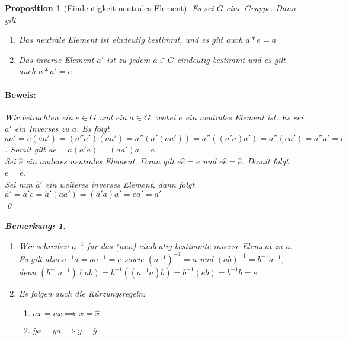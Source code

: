 \documentclass{report}
\theoremstyle{customrem}
\newtheorem*{bemerkung}{Bemerkung\textnormal:}
\theoremstyle{customdef}
\newtheorem{proposition}[definition]{Proposition}
\renewenvironment{proof}{\paragraph{Beweis: }}{\qed}
\theoremstyle{customenv}
\begin{document}
	\begin{proposition}[Eindeutigkeit neutrales Element]
		Es sei \(G\) eine Gruppe. Dann gilt
		\begin{enumerate}
			\itemsep0cm
			\item Das neutrale Element ist eindeutig bestimmt, und es gilt auch \(a \ast e = a\)
			\item Das inverse Element \(a'\) ist zu jedem \(a \in G\) eindeutig bestimmt und es gilt auch \(a \ast a' = e\)
		\end{enumerate}
		
		\begin{proof}
			Wir betrachten ein \(e \in G\) und ein \(a \in G\), wobei \(e\) ein neutrales Element ist. Es sei \(a'\) ein Inverses zu \(a\). Es folgt 
			\(a a' = e (a a') = (a'' a') (a a') = a'' (a' (a a')) = a'' ((a' a) a') = a'' (e a') = a'' a' = e\).
			Somit gilt \(a e = a (a' a) = (a a') a = a\).\\
			
			Sei \(\hat{e}\) ein anderes neutrales Element. Dann gilt \(e \hat{e} = e\) und \(e \hat{e} = \hat{e}\). Damit folgt \(e = \hat{e}\).\\
			
			Sei nun \(\hat{a}'\) ein weiteres inverses Element, dann folgt 
			\(\hat{a}' = \hat{a}' e = \hat{a}' (aa') = (\hat{a}'a)a' = ea' = a'\)\\
		\end{proof}\vspace{.25cm}
		\begin{bemerkung} \( \)
			\begin{enumerate}
				\itemsep0cm
				\item Wir schreiben \(a^{-1}\) für das (nun) eindeutig bestimmte inverse Element zu a.
				Es gilt also \(a^{-1}a = aa^{-1} = e\) sowie \((a^{-1})^{-1} = a\) und \((ab)^{-1} = b^{-1}a^{-1}\), denn \((b^{-1}a^{-1})(ab) = b^{-1}((a^{-1}a)b) = b^{-1}(eb) = b^{-1}b = e\)
				\item Es folgen auch die Kürzungsregeln:
				\begin{enumerate}[leftmargin=4.25cm]
					\itemsep0cm
					\item \(a \hat{x} = ax \implies x = \hat{x}\)
					\item \(\hat{y}a = ya \implies y = \hat{y}\)
				\end{enumerate}
			\end{enumerate}
		\end{bemerkung}
	\end{proposition}
	
\end{document}
